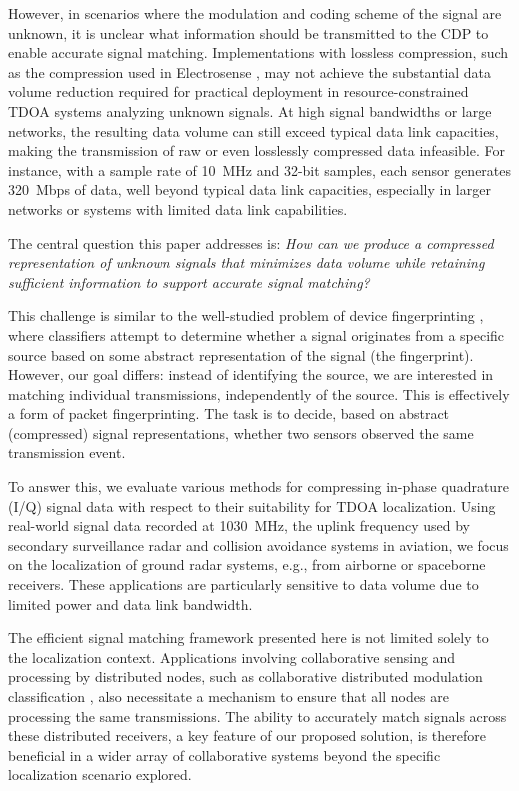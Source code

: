 \documentclass[sigconf, 10pt, nonacm, anonymous]{acmart}  %
\begin{document}
However, in scenarios where the modulation and coding scheme of the signal are unknown, it is unclear what information should be transmitted to the CDP to enable accurate signal matching. Implementations with lossless compression, such as the compression used in Electrosense \cite{rajendran2017electrosense}, may not achieve the substantial data volume reduction required for practical deployment in resource-constrained TDOA systems analyzing unknown signals. At high signal bandwidths or large networks, the resulting data volume can still exceed typical data link capacities, making the transmission of raw or even losslessly compressed data infeasible. For instance, with a sample rate of 10~MHz and 32-bit samples, each sensor generates 320~Mbps of data, well beyond typical data link capacities, especially in larger networks or systems with limited data link capabilities.

The central question this paper addresses is: \textit{How can we produce a compressed representation of unknown signals that minimizes data volume while retaining sufficient information to support accurate signal matching?}

This challenge is similar to the well-studied problem of device fingerprinting \cite{devicefingerprinting}, where classifiers attempt to determine whether a signal originates from a specific source based on some abstract representation of the signal (the fingerprint). However, our goal differs: instead of identifying the source, we are interested in matching individual transmissions, independently of the source. This is effectively a form of packet fingerprinting. The task is to decide, based on abstract (compressed) signal representations, whether two sensors observed the same transmission event.

To answer this, we evaluate various methods for compressing in-phase quadrature (I/Q) signal data with respect to their suitability for TDOA localization. Using real-world signal data recorded at 1030~MHz, the uplink frequency used by secondary surveillance radar and collision avoidance systems in aviation, we focus on the localization of ground radar systems, e.g., from airborne or spaceborne receivers. These applications are particularly sensitive to data volume due to limited power and data link bandwidth.

The efficient signal matching framework presented here is not limited solely to the localization context. Applications involving collaborative sensing and processing by distributed nodes, such as collaborative distributed modulation classification \cite{2024_dyspan}, also necessitate a mechanism to ensure that all nodes are processing the same transmissions. The ability to accurately match signals across these distributed receivers, a key feature of our proposed solution, is therefore beneficial in a wider array of collaborative systems beyond the specific localization scenario explored.
\end{document}
